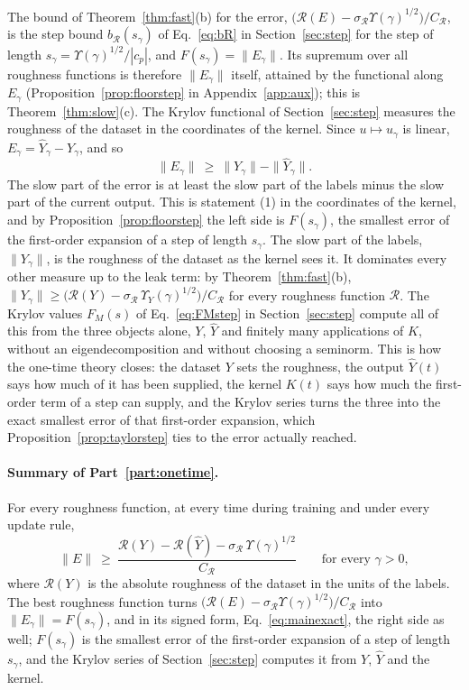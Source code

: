 \documentclass[11pt]{article}
\theoremstyle{definition}
\theoremstyle{remark}
\newcommand{\Rgh}{\mathcal{R}}           %
\newcommand{\sR}{\sigma_{\Rgh}}
\newcommand{\CR}{C_{\Rgh}}
\begin{document}
The bound of Theorem~\ref{thm:fast}(b) for the error, $\big(\Rgh(E) - \sR\Upsilon(\gamma)^{1/2}\big)/\CR$, is the step bound $b_\Rgh(s_\gamma)$ of Eq.~\eqref{eq:bR} in Section~\ref{sec:step} for the step of length $s_\gamma = \Upsilon(\gamma)^{1/2}/|c_p|$, and $F(s_\gamma) = \|E_\gamma\|$.
Its supremum over all roughness functions is therefore $\|E_\gamma\|$ itself, attained by the functional along $E_\gamma$ (Proposition~\ref{prop:floorstep} in Appendix~\ref{app:aux}); this is Theorem~\ref{thm:slow}(c).
The Krylov functional of Section~\ref{sec:step} measures the roughness of the dataset in the coordinates of the kernel.
Since $u \mapsto u_\gamma$ is linear, $E_\gamma = \hat Y_\gamma - Y_\gamma$, and so
\begin{equation}\label{eq:Yslow}
\|E_\gamma\| \ \ge\ \|Y_\gamma\| - \|\hat Y_\gamma\| .
\end{equation}
The slow part of the error is at least the slow part of the labels minus the slow part of the current output.
This is statement (1) in the coordinates of the kernel, and by Proposition~\ref{prop:floorstep} the left side is $F(s_\gamma)$, the smallest error of the first-order expansion of a step of length $s_\gamma$.
The slow part of the labels, $\|Y_\gamma\|$, is the roughness of the dataset as the kernel sees it.
It dominates every other measure up to the leak term: by Theorem~\ref{thm:fast}(b), $\|Y_\gamma\| \ge \big(\Rgh(Y) - \sR\,\Upsilon_Y(\gamma)^{1/2}\big)/\CR$ for every roughness function $\Rgh$.
The Krylov values $F_M(s)$ of Eq.~\eqref{eq:FMstep} in Section~\ref{sec:step} compute all of this from the three objects alone, $Y$, $\hat Y$ and finitely many applications of $K$, without an eigendecomposition and without choosing a seminorm.
This is how the one-time theory closes: the dataset $Y$ sets the roughness, the output $\hat Y(t)$ says how much of it has been supplied, the kernel $K(t)$ says how much the first-order term of a step can supply, and the Krylov series turns the three into the exact smallest error of that first-order expansion, which Proposition~\ref{prop:taylorstep} ties to the error actually reached.

\paragraph{Summary of Part~\ref{part:onetime}.}
For every roughness function, at every time during training and under every update rule,
\begin{equation}\label{eq:summary}
\|E\| \ \ge\ \frac{\Rgh(Y) - \Rgh(\hat Y) - \sR\,\Upsilon(\gamma)^{1/2}}{\CR}
\qquad\text{for every } \gamma > 0,
\end{equation}
where $\Rgh(Y)$ is the absolute roughness of the dataset in the units of the labels.
The best roughness function turns $\big(\Rgh(E) - \sR\Upsilon(\gamma)^{1/2}\big)/\CR$ into $\|E_\gamma\| = F(s_\gamma)$, and in its signed form, Eq.~\eqref{eq:mainexact}, the right side as well; $F(s_\gamma)$ is the smallest error of the first-order expansion of a step of length $s_\gamma$, and the Krylov series of Section~\ref{sec:step} computes it from $Y$, $\hat Y$ and the kernel.
\end{document}
